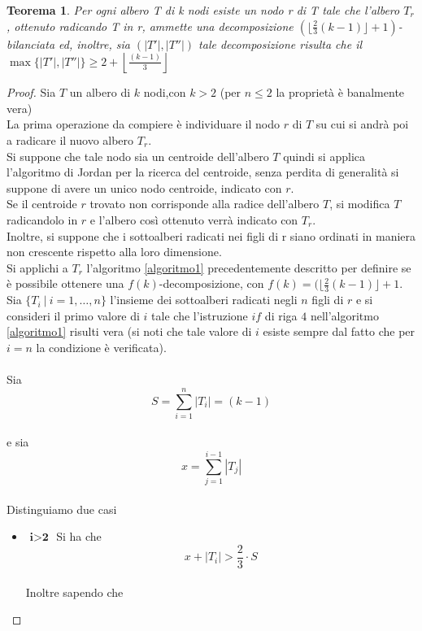\newtheorem{teorema1}[definizione]{Teorema}
\begin{teorema1}
	\label{teorema1 cap3 sez1}
Per ogni albero T di k nodi esiste un nodo r di T  tale che l'albero $T_r$, ottenuto radicando T in r, ammette una decomposizione $ (\lfloor \frac{2}{3}(k-1) \rfloor + 1)$-bilanciata ed, inoltre, sia $ (|T'|,|T''|)$ tale decomposizione risulta che il $ \max \{|T'|,|T''|\} \ge 2+ \left\lfloor \frac{(k-1)}{3}\right\rfloor $
\end{teorema1}\mbox{}
\begin{proof}
	
	Sia $ T $ un albero di $ k $ nodi,con $ k>2 $ (per $n\le2$ la propriet\`a \`e banalmente vera) \\
	La prima operazione da compiere \`e individuare il nodo $ r $ di $ T $ su cui si andr\`a poi a radicare il nuovo albero $ T_r $.\\
	Si suppone che tale nodo sia un centroide dell'albero $ T $ quindi si applica l'algoritmo di Jordan per la ricerca del centroide, senza perdita di generalit\`a si suppone di avere un unico nodo centroide, indicato con $ r $.\\
	Se il centroide $ r $ trovato non corrisponde alla radice dell'albero $ T $, si modifica $ T $ radicandolo in $ r $ e l'albero cos\`i ottenuto verr\`a indicato con $ T_r $. \\ 
	Inoltre, si suppone che i sottoalberi radicati nei figli di r siano ordinati in maniera non crescente rispetto alla loro dimensione.\\
	Si applichi a $ T_r $ l'algoritmo \ref{algoritmo1} precedentemente descritto per definire se \`e possibile ottenere una $ f(k) $-decomposizione, con $ f(k) =
	(\lfloor \frac{2}{3}(k-1) \rfloor + 1  $.\\
	Sia $ \{T_i \ | \  i=1,\dots,n\} $ l'insieme dei sottoalberi radicati negli $ n $ figli di $ r $ e si consideri il primo valore di $ i $ tale che l'istruzione $ if $ di riga $ 4 $ nell'algoritmo \ref{algoritmo1} risulti vera (si noti che tale valore di $ i $ esiste sempre dal fatto che per $ i = n $ la condizione \`e verificata).\mbox{}\\\\
	Sia 
	\[ S = \sum_{i=1}^{n}{|T_i|} = (k-1 ) \]\\
	e sia
	\[ x = \sum_{j=1}^{i-1}{|T_j|} \]\\
	Distinguiamo due casi
	\begin{itemize}
	\item $\textbf{ i>2 }$ Si ha che
	\\ 
	\begin{equation}\label{1}
		x+|T_i| > \frac{2}{3}\cdot S
	\end{equation}
\\
	Inoltre sapendo che
	\\
	

\end{itemize}
\end{proof}
